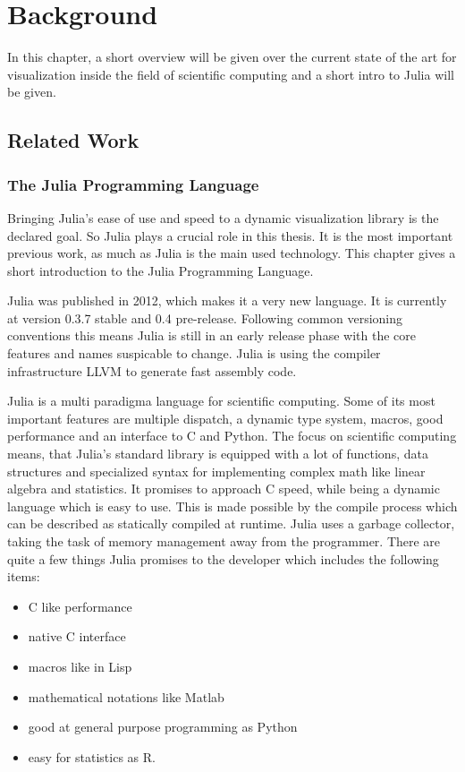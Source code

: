 \section{Background}

In this chapter, a short overview will be given over the current state of the art for visualization inside the field of scientific computing and a short intro to Julia will be given.

\subsection{Related Work}

\subsubsection{The Julia Programming Language}

Bringing Julia's ease of use and speed to a dynamic visualization library is the declared goal.
So Julia plays a crucial role in this thesis. 
It is the most important previous work, as much as Julia is the main used technology.
This chapter gives a short introduction to the Julia Programming Language.

Julia was published in 2012, which makes it a very new language. It is currently at version 0.3.7 stable and 0.4 pre-release.
Following common versioning conventions this means Julia is still in an early release phase with the core features and names suspicable to change.
Julia is using the compiler infrastructure \ac{LLVM} to generate fast assembly code.

Julia is a multi paradigma language for scientific computing. 
Some of its most important features are multiple dispatch, a dynamic type system, macros, good performance and an interface to C and Python.
The focus on scientific computing means, that Julia's standard library is equipped with a lot of functions, data structures and specialized syntax for implementing complex math like linear algebra and statistics.
It promises to approach C speed, while being a dynamic language which is easy to use.
This is made possible by the compile process which can be described as statically compiled at runtime.
Julia uses a garbage collector, taking the task of memory management away from the programmer.
There are quite a few things Julia promises to the developer which includes the following items\cite{WhyJulia}:

\begin{itemize}
	\item C like performance
	\item native C interface
	\item macros like in Lisp
	\item mathematical notations like Matlab
	\item good at general purpose programming as Python
	\item easy for statistics as R.
\end{itemize}

